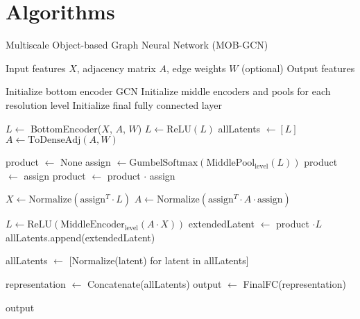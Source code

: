 \section{Algorithms} \label{sec:apx_algorithms}

\begin{algorithm}[ht]
\caption{Multiscale Object-based Graph Neural Network (MOB-GCN)}
\begin{algorithmic}[1]
\Require Input features $X$, adjacency matrix $A$, edge weights $W$ (optional)
\Ensure Output features

\State Initialize bottom encoder GCN
\State Initialize middle encoders and pools for each resolution level
\State Initialize final fully connected layer

    \State $L \gets$ BottomEncoder($X$, $A$, $W$)
    \State $L \gets \text{ReLU}(L)$
    \State allLatents $\gets [L]$
    \State $A \gets \text{ToDenseAdj}(A, W)$
    
    \State product $\gets$ None
        \State assign $\gets \text{GumbelSoftmax}(\text{MiddlePool}_\text{level}(L))$
            \State product $\gets$ assign
        \Else
            \State product $\gets$ product $\cdot$ assign
        \EndIf
        
        \State $X \gets \text{Normalize}(\text{assign}^T \cdot L)$
        \State $A \gets \text{Normalize}(\text{assign}^T \cdot A \cdot \text{assign})$
        
        \State $L \gets \text{ReLU}(\text{MiddleEncoder}_\text{level}(A \cdot X))$
        \State extendedLatent $\gets$ product $\cdot L$
        \State allLatents.append(extendedLatent)
    \EndFor
    
        \State allLatents $\gets$ [Normalize(latent) for latent in allLatents]
    \EndIf
    
    \State representation $\gets$ Concatenate(allLatents)
    \State output $\gets$ FinalFC(representation)
    
    \Return output
\EndFunction
\end{algorithmic}
\end{algorithm}


